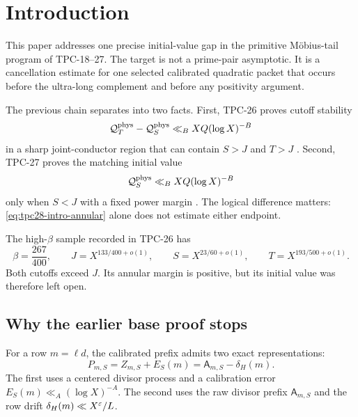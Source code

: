 \section{Introduction}
\label{sec:tpc28-introduction}

This paper addresses one precise initial-value gap in the primitive
M\"obius-tail program of TPC-18--27.  The target is not a prime-pair
asymptotic.  It is a cancellation estimate for one selected calibrated
quadratic packet that occurs before the ultra-long complement and
before any positivity argument.

The previous chain separates into two facts.  First, TPC-26 proves
cutoff stability
\begin{equation}
 \mathcal Q_T^{\rm phys}-\mathcal Q_S^{\rm phys}
 \ll_B XQ(\log X)^{-B}
 \label{eq:tpc28-intro-annular}
\end{equation}
in a sharp joint-conductor region that can contain $S>J$ and $T>J$
\citep{WangTPC26}.  Second, TPC-27 proves the matching initial value
\begin{equation}
 \mathcal Q_S^{\rm phys}
 \ll_B XQ(\log X)^{-B}
 \label{eq:tpc28-intro-old-base}
\end{equation}
only when $S<J$ with a fixed power margin \citep{WangTPC27}.  The
logical difference matters: \eqref{eq:tpc28-intro-annular} alone does
not estimate either endpoint.

The high-$\beta$ sample recorded in TPC-26 has
\begin{equation}
 \beta=\frac{267}{400},\qquad
 J=X^{133/400+o(1)},\qquad
 S=X^{23/60+o(1)},\qquad
 T=X^{193/500+o(1)}.
 \label{eq:tpc28-intro-high-sample}
\end{equation}
Both cutoffs exceed $J$.  Its annular margin is positive, but its
initial value was therefore left open.

\subsection{Why the earlier base proof stops}

For a row $m=\ell d$, the calibrated prefix admits two exact
representations:
\begin{equation}
 P_{m,S}=Z_{m,S}+E_S(m)
 =\mathsf A_{m,S}-\delta_H(m).
 \label{eq:tpc28-two-representations}
\end{equation}
The first uses a centered divisor process and a calibration error
 $E_S(m)\ll_A(\log X)^{-A}$.  The second uses the raw divisor prefix
\(\mathsf A_{m,S}\) and the row drift
\(\delta_H(m)\ll X^\varepsilon/L\).

